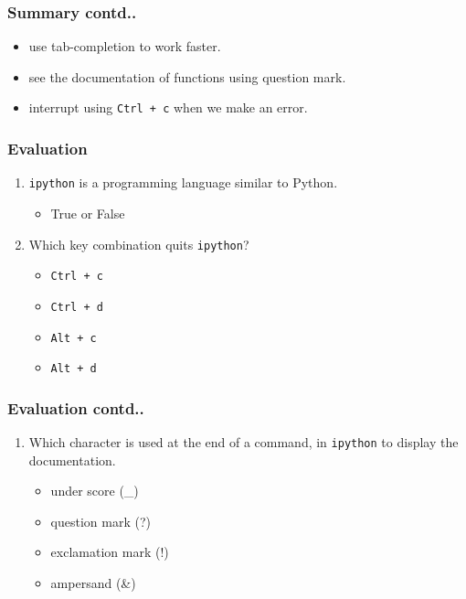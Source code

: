 \documentclass[17pt,compress]{beamer}
\newcounter{saveenumi}
\newcommand{\seti}{\setcounter{saveenumi}{\value{enumi}}}
\newcommand{\conti}{\setcounter{enumi}{\value{saveenumi}}}
\begin{document}
\begin{frame}
\frametitle{Summary contd..}
\begin{itemize}
\item use tab-completion to work faster.
\item see the documentation of functions using question mark.
\item interrupt using \texttt{Ctrl + c} when we make an error.
\end{itemize}
\end{frame}
\begin{frame}
\frametitle{Evaluation}
\begin{enumerate}
\item \texttt{ipython} is a programming language similar to Python.
\begin{itemize}
\item True or False\pause
\end{itemize}
\item Which key combination quits \texttt{ipython}?\pause
\begin{itemize}
\item \texttt{Ctrl + c}
\item \texttt{Ctrl + d}
\item \texttt{Alt + c}
\item \texttt{Alt + d}
	\seti
\end{itemize}
\end{enumerate}
\end{frame}
\begin{frame}
\frametitle{Evaluation contd..}
\begin{enumerate}
	\conti
\item Which character is used at the end of a command, in \texttt{ipython} to
display the documentation.\pause
\begin{itemize}
\item under score (\_)
\item question mark (?)
\item exclamation mark (!)
\item ampersand (\&)
\end{itemize}
\end{enumerate}
\end{frame}
\end{document}
